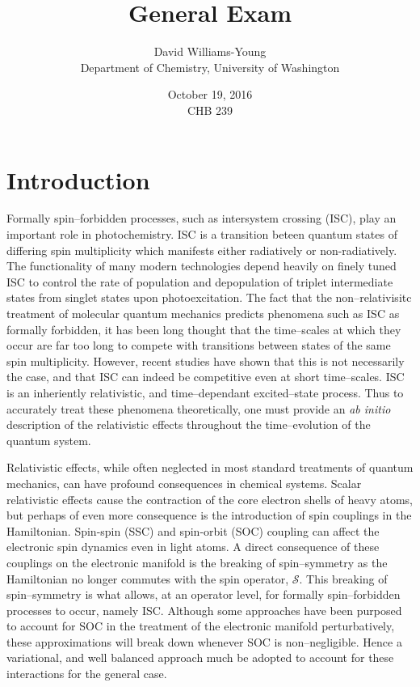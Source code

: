 \documentclass[12pt]{article}
\title{General Exam}
\date{October 19, 2016 \\ CHB 239}
\author{David Williams-Young\\ Department of Chemistry, University of Washington}
\newcommand*\op[1]{\mathcal{#1}}
\begin{document}
\linespread{1.0}
\maketitle
\linespread{1.5}

\newpage
\section{Introduction}

Formally spin--forbidden processes, such as intersystem crossing (ISC),  play
an important role in photochemistry. ISC is a transition beteen quantum states
of differing spin multiplicity which manifests either radiatively or
non-radiatively.  The functionality of many modern technologies depend heavily
on finely tuned ISC to control the rate of population and depopulation of
triplet intermediate states from singlet states upon photoexcitation. The fact
that the non--relativisitc treatment of molecular quantum mechanics predicts
phenomena such as ISC as formally forbidden, it has been long thought that the
time--scales at which they occur are far too long to compete with transitions
between states of the same spin multiplicity. However, recent studies have
shown that this is not necessarily the case, and that ISC can indeed be
competitive even at short time--scales.  ISC is an inheriently relativistic, and
time--dependant excited--state process. Thus to accurately treat these phenomena
theoretically, one must provide an \emph{ab initio} description of the
relativistic effects throughout the time--evolution of the quantum system.  

Relativistic effects, while often neglected in most standard treatments of
quantum mechanics, can have profound consequences in chemical
systems.\cite{Pyykko12_45} Scalar relativistic effects cause the contraction of
the core electron shells of heavy atoms, but perhaps of even more consequence is
the introduction of spin couplings in the Hamiltonian.  Spin-spin (SSC) and
spin-orbit (SOC) coupling can affect the electronic spin dynamics even in light
atoms. A direct consequence of these couplings on the electronic manifold is the
breaking of spin--symmetry as the Hamiltonian no longer commutes with the spin
operator, $\op{S}$. This breaking of spin--symmetry is what allows, at an
operator level, for formally spin--forbidden processes to occur, namely
ISC. Although some approaches have been purposed to account for SOC in the
treatment of the electronic manifold perturbatively\cite{Thiel14_JCP124101},
these approximations will break down whenever SOC is non--negligible. Hence a
variational, and well balanced approach much be adopted to account for these
interactions for the general case.  
\end{document}
